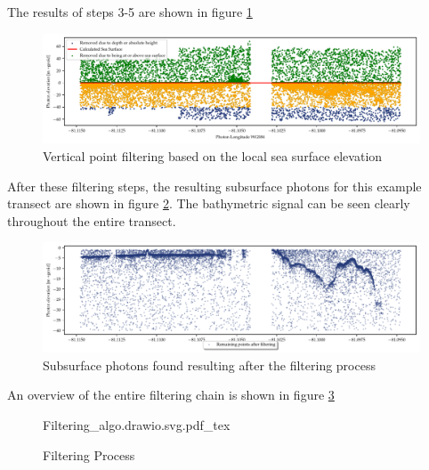 \begin{enumerate}
    
    The results of steps 3-5 are shown in figure \ref{fig:vert_filtering}
    \begin{figure}[h]
        \centering
        \includegraphics[width=\textwidth]{figures/methodology_sealvl_filtering.pdf}
        \caption{Vertical point filtering based on the local sea surface elevation}
        \label{fig:vert_filtering}
    \end{figure}
\end{enumerate}

After these filtering steps, the resulting subsurface photons for this example transect are shown in figure \ref{fig:remaing_photons}. The bathymetric signal can be seen clearly throughout the entire transect.

\begin{figure}[h]
    \centering
    \includegraphics[width=\textwidth]{figures/methodology_reminaing_after_filtering.pdf}
    \caption{Subsurface photons found resulting after the filtering process}
    \label{fig:remaing_photons}
\end{figure}

An overview of the entire filtering chain is shown in figure \ref{fig:filtering-flowchart} 

\begin{figure}[h]
    \centering
    {Filtering_algo.drawio.svg.pdf_tex}
    \caption{Filtering Process}
    \label{fig:filtering-flowchart}
\end{figure}

